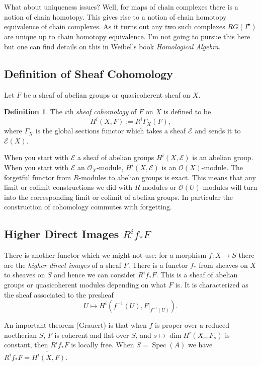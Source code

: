 \documentclass[12pt]{article}
\numberwithin{equation}{section}
\theoremstyle{definition}
\newtheorem{definition}[theorem]{Definition}
\theoremstyle{remark}
\newcommand{\Ocal}{\mathcal{O}}
\newcommand{\Spec}{\operatorname{Spec}}
\newcommand{\Ecal}{\mathcal{E}}
\begin{document}
What about uniqueness issues? Well, for maps of chain complexes there is a notion of chain homotopy. This gives rise to a notion of chain homotopy equivalence of chain complexes. 
As it turns out any two such complexes $RG(I^{\bullet})$ are unique up to chain homotopy equivalence.
I'm not going to pursue this here but one can find details on this in Weibel's book \emph{Homological Algebra}.

\subsection{Definition of Sheaf Cohomology}
Let $F$ be a sheaf of abelian groups or quasicoherent sheaf on $X$.
\begin{definition}
	The $i$th \emph{sheaf cohomology} of $F$ on $X$ is defined to be 
	 $$ H^i(X,F):= R^i\Gamma_X(F), $$
	 where $\Gamma_X$ is the global sections functor which takes a sheaf $\mathcal{E}$ and sends it to $\mathcal{E}(X)$.
\end{definition}

When you start with $\mathcal{E}$ a sheaf of abelian groups $H^i(X,\Ecal)$ is an abelian group. 
When you start with $\Ecal$ an $\Ocal_X$-module, $H^i(X,\Ecal)$ is an $\Ocal(X)$-module.
The forgetful functor from $R$-modules to abelian groups is exact.
This means that any limit or colimit constructions we did with $R$-modules or $\Ocal(U)$-modules will turn into the corresponding limit or colimit of abelian groups. 
In particular the construction of cohomology commutes with forgetting. 



\subsection{Higher Direct Images $R^if_*F$ }

There is another functor which we might not use: for a morphism $f:X\to S$ there are the \emph{higher direct images} of a sheaf $F$. 
There is a functor $f_*$ from sheaves on $X$ to sheaves on $S$ and hence we can consider $R^if_*F$. 
This is a sheaf of abelian groups or quasicoherent modules depending on what $F$ is. 
It is characterized as the sheaf associated to the presheaf 
 $$ U \mapsto H^i(f^{-1}(U),F\vert_{f^{-1}(U)}). $$

An important theorem (Grauert) is that when $f$ is proper over a reduced noetherian $S$, $F$ is coherent and flat over $S$, and $s\mapsto \dim H^i(X_s,F_s)$ is constant, then $R^if_*F$ is locally free. 
When $S=\Spec(A)$ we have $R^if_*F = \widetilde{H^i(X,F)}$.
\end{document}
